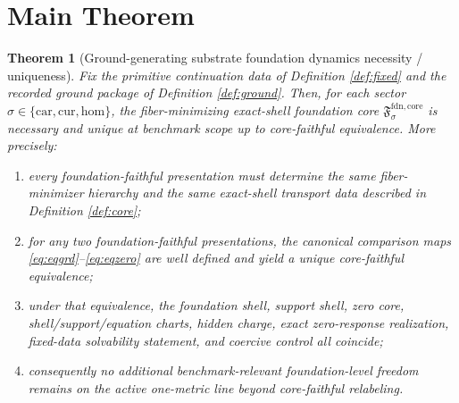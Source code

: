 \documentclass[11pt]{article}
\newcommand{\Car}{\mathrm{car}}
\newcommand{\Cur}{\mathrm{cur}}
\newcommand{\Hom}{\mathrm{hom}}
\newcommand{\FoundCore}[1]{\mathfrak F_{#1}^{\mathrm{fdn,core}}}
\newtheorem{theorem}{Theorem}
\begin{document}
\section{Main Theorem}

\begin{theorem}[Ground-generating substrate foundation dynamics necessity / uniqueness]
\label{thm:main}
Fix the primitive continuation data of Definition \ref{def:fixed} and the recorded ground package of Definition \ref{def:ground}. Then, for each sector \(\sigma\in\{\Car,\Cur,\Hom\}\), the fiber-minimizing exact-shell foundation core \(\FoundCore{\sigma}\) is necessary and unique at benchmark scope up to core-faithful equivalence. More precisely:
\begin{enumerate}
    \item every foundation-faithful presentation must determine the same fiber-minimizer hierarchy and the same exact-shell transport data described in Definition \ref{def:core};
    \item for any two foundation-faithful presentations, the canonical comparison maps \eqref{eq:eqgrd}--\eqref{eq:eqzero} are well defined and yield a unique core-faithful equivalence;
    \item under that equivalence, the foundation shell, support shell, zero core, shell/support/equation charts, hidden charge, exact zero-response realization, fixed-data solvability statement, and coercive control all coincide;
    \item consequently no additional benchmark-relevant foundation-level freedom remains on the active one-metric line beyond core-faithful relabeling.
\end{enumerate}
\end{theorem}
\end{document}
